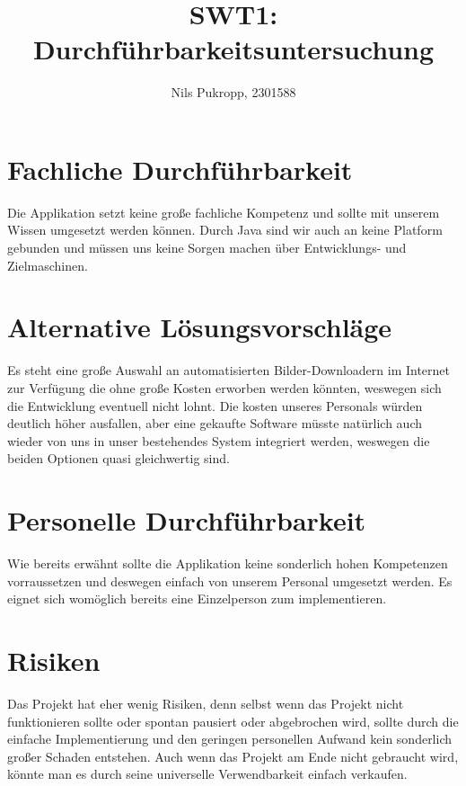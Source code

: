 \documentclass[parskip=full]{scrartcl}
\title{SWT1: Durchführbarkeitsuntersuchung}
\author{Nils Pukropp, 2301588}
\begin{document}
\maketitle

%
%
\section{Fachliche Durchführbarkeit}
\begin{flushleft}
	Die Applikation setzt keine große fachliche Kompetenz und sollte mit unserem Wissen umgesetzt werden können.
	Durch Java sind wir auch an keine Platform gebunden und müssen uns keine Sorgen machen über Entwicklungs- und Zielmaschinen.
\end{flushleft}

\section{Alternative Lösungsvorschläge}
\begin{flushleft}
	Es steht eine große Auswahl an automatisierten Bilder-Downloadern im Internet zur Verfügung die ohne große Kosten erworben werden könnten, weswegen sich die Entwicklung eventuell nicht lohnt.
	Die kosten unseres Personals würden deutlich höher ausfallen, aber eine gekaufte Software müsste natürlich auch wieder von uns in unser bestehendes System integriert werden, weswegen die beiden Optionen quasi gleichwertig sind.
\end{flushleft}

\section{Personelle Durchführbarkeit}
\begin{flushleft}
	Wie bereits erwähnt sollte die Applikation keine sonderlich hohen Kompetenzen vorraussetzen und deswegen einfach von unserem Personal umgesetzt werden. Es eignet sich womöglich bereits eine Einzelperson zum implementieren.

\end{flushleft}

\section{Risiken}
\begin{flushleft}
	Das Projekt hat eher wenig Risiken, denn selbst wenn das Projekt nicht funktionieren sollte oder spontan pausiert oder abgebrochen wird, sollte durch die einfache Implementierung und den geringen personellen Aufwand kein sonderlich großer Schaden entstehen.
	Auch wenn das Projekt am Ende nicht gebraucht wird, könnte man es durch seine universelle Verwendbarkeit einfach verkaufen.
\end{flushleft}
\end{document}
